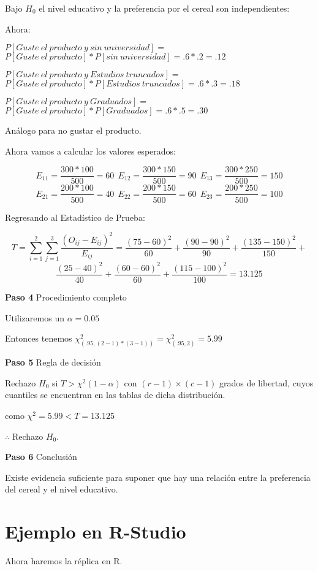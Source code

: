 \documentclass[
  a4paper,
  oneside,
  openany]{book}
\begin{document}
Bajo \(H_0\) el nivel educativo y la preferencia por el cereal son independientes:

Ahora:

\(P[Guste\ el\ producto\ y\ sin\ universidad]=\)
\(P[Guste\ el\ producto]*P[sin\ universidad]=.6*.2=.12\)

\(P[Guste\ el\ producto\ y\ Estudios\ truncados]=\)
\(P[Guste\ el\ producto]*P[Estudios\ truncados]=.6*.3=.18\)

\(P[Guste\ el\ producto\ y\ Graduados]=\)
\(P[Guste\ el\ producto]*P[Graduados]=.6*.5=.30\)

Análogo para no gustar el producto.

Ahora vamos a calcular los valores esperados:

\[E_{11}=\frac{300*100}{500}=60 \ \ E_{12}=\frac{300*150}{500}=90 \ \  E_{13}=\frac{300*250}{500}=150\]
\[E_{21}=\frac{200*100}{500}=40 \ \  E_{22}=\frac{200*150}{500}=60 \ \ E_{23}=\frac{200*250}{500}=100\]

Regresando al Estadístico de Prueba:

\[T=\sum_{i=1}^{2}\sum_{j=1}^{3}\frac{(O_{ij}-E_{ij})^2}{E_{ij}}= \frac{(75-60)^2}{60}+\frac{(90-90)^2}{90}+\frac{(135-150)^2}{150}+\]
\[\frac{(25-40)^2}{40}+\frac{(60-60)^2}{60}+\frac{(115-100)^2}{100}=13.125\]

\textbf{Paso 4} Procedimiento completo

Utilizaremos un \(\alpha=0.05\)

Entonces tenemos \(\chi^2_{(.95,(2-1)*(3-1))}=\chi^2_{(.95,2)}=5.99\)

\textbf{Paso 5} Regla de decisión

Rechazo \(H_0\) si \(T> \chi^2(1-\alpha)\) con \((r-1)\times(c-1)\) grados de libertad, cuyos cuantiles se encuentran en las tablas de dicha distribución.

como \(\chi^2=5.99 < T=13.125\)

\(\therefore\) Rechazo \(H_0\).

\textbf{Paso 6} Conclusión

Existe evidencia suficiente para suponer que hay una relación entre la preferencia del cereal y el nivel educativo.

\hypertarget{ejemplo-en-r-studio-10}{%
\section{Ejemplo en R-Studio}\label{ejemplo-en-r-studio-10}}

Ahora haremos la réplica en R.
\end{document}

